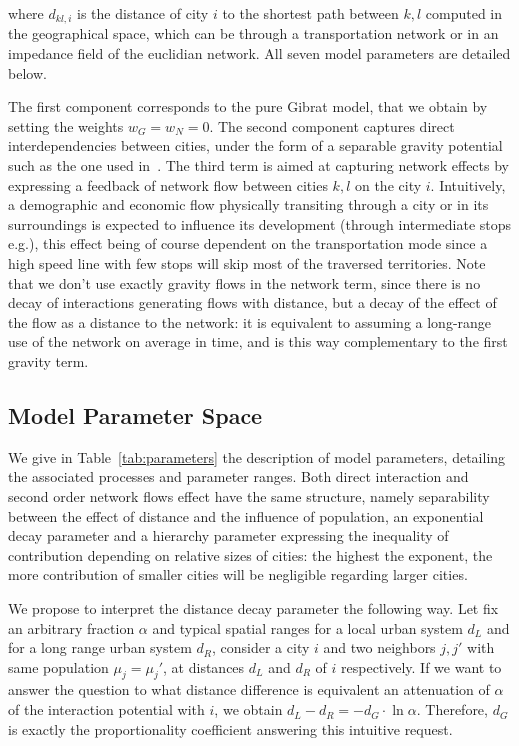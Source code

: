 \documentclass{article}
\begin{document}
where $d_{kl,i}$ is the distance of city $i$ to the shortest path between $k,l$ computed in the geographical space, which can be through a transportation network or in an impedance field of the euclidian network. All seven model parameters are detailed below.


The first component corresponds to the pure Gibrat model, that we obtain by setting the weights $w_G = w_N = 0$. The second component captures direct interdependencies between cities, under the form of a separable gravity potential such as the one used in~\cite{sanders1992systeme}. The third term is aimed at capturing network effects by expressing a feedback of network flow between cities $k,l$ on the city $i$. Intuitively, a demographic and economic flow physically transiting through a city or in its surroundings is expected to influence its development (through intermediate stops e.g.), this effect being of course dependent on the transportation mode since a high speed line with few stops will skip most of the traversed territories. Note that we don't use exactly gravity flows in the network term, since there is no decay of interactions generating flows with distance, but a decay of the effect of the flow as a distance to the network: it is equivalent to assuming a long-range use of the network on average in time, and is this way complementary to the first gravity term.


\subsection*{Model Parameter Space}

We give in Table~\ref{tab:parameters} the description of model parameters, detailing the associated processes and parameter ranges. Both direct interaction and second order network flows effect have the same structure, namely separability between the effect of distance and the influence of population, an exponential decay parameter and a hierarchy parameter expressing the inequality of contribution depending on relative sizes of cities: the highest the exponent, the more contribution of smaller cities will be negligible regarding larger cities.

We propose to interpret the distance decay parameter the following way. Let fix an arbitrary fraction $\alpha$ and typical spatial ranges for a local urban system $d_L$ and for a long range urban system $d_R$, consider a city $i$ and two neighbors $j,j'$ with same population $\mu_j=\mu_j'$, at distances $d_L$ and $d_R$ of $i$ respectively. If we want to answer the question to what distance difference is equivalent an attenuation of $\alpha$ of the interaction potential with $i$, we obtain $d_L - d_R = -d_G\cdot \ln \alpha$. Therefore, $d_G$ is exactly the proportionality coefficient answering this intuitive request.
\end{document}

